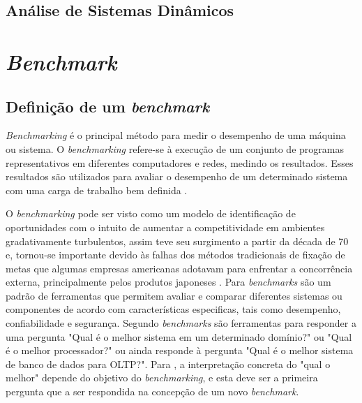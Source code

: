 \subsection{Análise de Sistemas Dinâmicos}

\section{\textit{Benchmark}}
\subsection{Definição de um \textit{benchmark}}
\textit{Benchmarking} é o principal método para medir o desempenho de uma máquina ou sistema. O \textit{benchmarking} refere-se à execução de um conjunto de programas representativos em diferentes computadores e redes, medindo os resultados. Esses resultados são utilizados para avaliar o desempenho de um determinado sistema com uma carga de trabalho bem definida \cite{Menasce2001}.

O \textit{benchmarking} pode ser visto como um modelo de identificação de oportunidades com o intuito de aumentar a competitividade em ambientes gradativamente turbulentos, assim teve seu surgimento a partir da década de 70 e, tornou-se importante devido às falhas dos métodos tradicionais de fixação de metas que algumas empresas americanas adotavam para enfrentar a concorrência externa, principalmente pelos produtos japoneses \cite{Camila2008}. Para \cite{Marco2012} \textit{benchmarks} são um padrão de ferramentas que permitem avaliar e comparar diferentes sistemas ou componentes de acordo com características especificas, tais como desempenho, confiabilidade e segurança. Segundo \cite{Folkerts2013} \textit{benchmarks} são ferramentas para responder a uma pergunta "Qual é o melhor sistema em um determinado domínio?" ou "Qual é o melhor processador?" ou ainda responde à pergunta "Qual é o melhor sistema de banco de dados para OLTP?". Para \cite{Folkerts2013}, a interpretação concreta do "qual o melhor" depende do objetivo do \textit{benchmarking}, e esta deve ser a primeira pergunta que a ser respondida na concepção de um novo \textit{benchmark}. 


